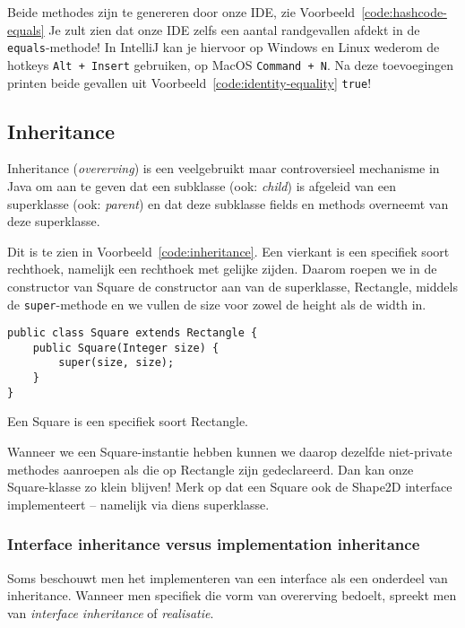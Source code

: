Beide methodes zijn te genereren door onze IDE, zie Voorbeeld~\ref{code:hashcode-equals}
Je zult zien dat onze IDE zelfs een aantal randgevallen afdekt in de \texttt{equals}-methode!
In IntelliJ kan je hiervoor op Windows en Linux wederom 
de hotkeys \texttt{Alt + Insert} gebruiken, op MacOS \texttt{Command + N}.
Na deze toevoegingen printen beide gevallen uit Voorbeeld~\ref{code:identity-equality}
\texttt{true}!

\subsection{Inheritance}
Inheritance (\textit{overerving}) is een veelgebruikt maar controversieel mechanisme in Java 
om aan te geven dat een subklasse (ook: \textit{child}) is afgeleid van 
een superklasse (ook: \textit{parent}) en dat deze subklasse  
fields en methods overneemt van deze superklasse.

Dit is te zien in Voorbeeld~\ref{code:inheritance}. Een vierkant is een 
specifiek soort rechthoek, namelijk een rechthoek met gelijke zijden.
Daarom roepen we in de constructor van Square de constructor aan van 
de superklasse, Rectangle, middels de \texttt{super}-methode en we vullen 
de size voor zowel de height als de width in.

\begin{listing}[H]
\begin{verbatim}
public class Square extends Rectangle {
    public Square(Integer size) {
        super(size, size);
    }
}
\end{verbatim}
\caption{Een Square is een specifiek soort Rectangle.}
\label{code:inheritance}
\end{listing}

Wanneer we een Square-instantie hebben kunnen we daarop dezelfde 
niet-private methodes aanroepen als die op Rectangle zijn gedeclareerd.
Dan kan onze Square-klasse zo klein blijven!
Merk op dat een Square ook de Shape2D interface implementeert 
-- namelijk via diens superklasse.

\subsubsection{Interface inheritance versus implementation inheritance}
Soms beschouwt men het implementeren van een interface
als een onderdeel van inheritance. Wanneer men specifiek 
die vorm van overerving bedoelt, spreekt men van \textit{interface inheritance}
of \textit{realisatie}.

